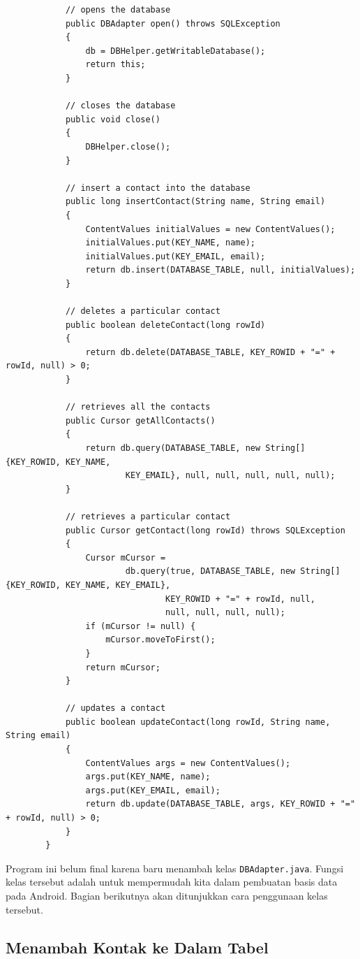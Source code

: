 \documentclass{scrartcl}
\begin{document}
\begin{enumerate}
\begin{verbatim}
			// opens the database
			public DBAdapter open() throws SQLException
			{
				db = DBHelper.getWritableDatabase();
				return this;
			}
			
			// closes the database
			public void close()
			{
				DBHelper.close();
			}
			
			// insert a contact into the database
			public long insertContact(String name, String email)
			{
				ContentValues initialValues = new ContentValues();
				initialValues.put(KEY_NAME, name);
				initialValues.put(KEY_EMAIL, email);
				return db.insert(DATABASE_TABLE, null, initialValues);
			}
			
			// deletes a particular contact
			public boolean deleteContact(long rowId)
			{
				return db.delete(DATABASE_TABLE, KEY_ROWID + "=" + rowId, null) > 0;
			}
			
			// retrieves all the contacts
			public Cursor getAllContacts()
			{
				return db.query(DATABASE_TABLE, new String[] {KEY_ROWID, KEY_NAME,
						KEY_EMAIL}, null, null, null, null, null);
			}
			
			// retrieves a particular contact
			public Cursor getContact(long rowId) throws SQLException
			{
				Cursor mCursor =
						db.query(true, DATABASE_TABLE, new String[] {KEY_ROWID, KEY_NAME, KEY_EMAIL},
								KEY_ROWID + "=" + rowId, null,
								null, null, null, null);
				if (mCursor != null) {
					mCursor.moveToFirst();
				}
				return mCursor;
			}
			
			// updates a contact
			public boolean updateContact(long rowId, String name, String email)
			{
				ContentValues args = new ContentValues();
				args.put(KEY_NAME, name);
				args.put(KEY_EMAIL, email);
				return db.update(DATABASE_TABLE, args, KEY_ROWID + "=" + rowId, null) > 0;
			}
		}
		\end{verbatim}
	\end{enumerate}
	
	Program ini belum final karena baru menambah kelas \texttt{DBAdapter.java}. Fungsi kelas tersebut adalah untuk mempermudah kita dalam pembuatan basis data pada Android. Bagian berikutnya akan ditunjukkan cara penggunaan kelas tersebut.
	
	\subsection{Menambah Kontak ke Dalam Tabel}
	
\end{document}
